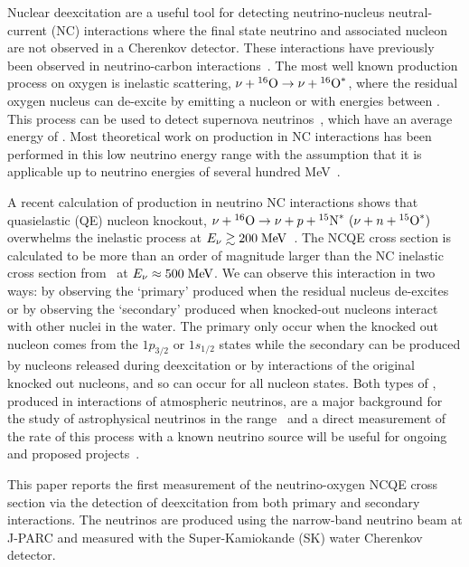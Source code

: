 \documentclass[
aps,
prd,
twocolumn,
superscriptaddress,
showpacs
]{revtex4-1}
\begin{document}
Nuclear deexcitation \gmrs are a useful tool for detecting neutrino-nucleus neutral-current (NC) interactions where the final state neutrino and associated nucleon are not observed in a Cherenkov detector.  These interactions have previously been observed in neutrino-carbon interactions~\cite{Bodmann:1992ur,Armbruster:1998gk}.  The most well known \gmr production process on oxygen is inelastic scattering, $\nu + {}^{16}\textrm{O}\rightarrow \nu + {}^{16}\textrm{O}^*$, where the residual oxygen nucleus can de-excite by emitting a nucleon or \gmrs with energies between . This process can be used to detect supernova neutrinos~\cite{Langanke:1995he}, which have an average energy of . Most theoretical work on \gmr production in NC interactions has been performed in this low neutrino energy range with the assumption that it is applicable up to neutrino energies of several hundred MeV~\cite{Kolbe:1992xu,Beacom:1998ya,*Beacom:1998yb,Nussinov:2000qc,Kolbe:2002gk}.

A recent calculation of \gmr production in neutrino NC interactions shows that quasielastic (QE) nucleon knockout, $\nu + {}^{16}\textrm{O} \rightarrow \nu + p + {}^{15}\textrm{N}^*\ (\nu + n + {}^{15}\textrm{O}^*)$ overwhelms the inelastic process at $E_{\nu} \gtrsim 200 \; \mathrm{MeV}$~\cite{Ankowski:2011ei}. The NCQE cross section is calculated to be more than an order of magnitude larger than the NC inelastic cross section from~\cite{Kolbe:2002gk} at $E_{\nu} \approx 500 \; \mathrm{MeV}$.  
We can observe this interaction in two ways: by observing the `primary' \gmrs produced when the residual nucleus de-excites or by observing the `secondary' \gmrs produced when knocked-out nucleons interact with other nuclei in the water.  The primary \gmrs only occur when the knocked out nucleon comes from the $1p_{3/2}$ or $1s_{1/2}$ states while the secondary \gmrs can be produced by nucleons released during deexcitation or by interactions of the original knocked out nucleons, and so can occur for all nucleon states.
Both types of \gmrs, produced in interactions of atmospheric neutrinos, are a major background for the study of astrophysical neutrinos in the  range~\cite{Bays:2011si,Ueno:2012md} and a direct measurement of the rate of this process with a known neutrino source will be useful for ongoing and proposed projects~\cite{Fukuda:2002uc,Beacom:2003nk,Abe:2011ts,Akiri:2011dv}.

This paper reports the first measurement of the neutrino-oxygen NCQE cross section via the detection of deexcitation \gmrs from both primary and secondary interactions. The neutrinos are produced using the narrow-band neutrino beam at J-PARC and measured with the Super-Kamiokande (SK) water Cherenkov detector. 
\end{document}
